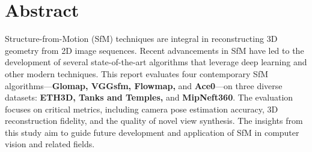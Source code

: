 \section*{Abstract}\label{sec:abstract}

Structure-from-Motion (SfM) techniques are integral in reconstructing 3D geometry from 2D image sequences.
Recent advancements in SfM have led to the development of several state-of-the-art algorithms that leverage deep learning and other modern techniques.
This report evaluates four contemporary SfM algorithms---\textbf{Glomap, VGGsfm, Flowmap,} and \textbf{Ace0}---on three diverse datasets:\textbf{ ETH3D, Tanks and Temples,} and \textbf{MipNeft360}. 
The evaluation focuses on critical metrics, including camera pose estimation accuracy, 3D reconstruction fidelity, and the quality of novel view synthesis.
The insights from this study aim to guide future development and application of SfM in computer vision and related fields.
